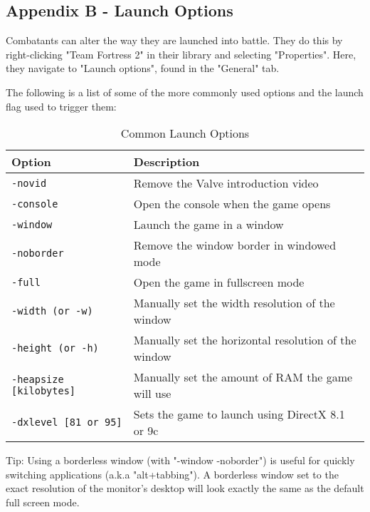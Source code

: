 \subsection{Appendix B - Launch Options}
Combatants can alter the way they are launched into battle. They do this by right-clicking "Team Fortress 2" in their library and selecting "Properties". Here, they navigate to "Launch options", found in the "General" tab.

The following is a list of some of the more commonly used options and the launch flag used to trigger them:

\begin{table}[h!b!p!]
\caption{Common Launch Options}
\begin{tabular}{|l|p{10.5cm}|}
	\hline
		Option & Description\\
	\hline
	\texttt{-novid}&Remove the Valve introduction video\\
	\texttt{-console}&Open the console when the game opens\\
	\texttt{-window}&Launch the game in a window\\
	\texttt{-noborder}&Remove the window border in windowed mode\\
	\texttt{-full}&Open the game in fullscreen mode\\
	\texttt{-width (or -w)}&Manually set the width resolution of the window\\
	\texttt{-height (or -h)}&Manually set the horizontal resolution of the window\\
	\texttt{-heapsize [kilobytes]}&Manually set the amount of RAM the game will use\\
	\texttt{-dxlevel [81 or 95]}&Sets the game to launch using DirectX 8.1 or 9c\\

  	\hline
\end{tabular}
\label{table_launch_options}
\end{table}

Tip: Using a borderless window (with "-window -noborder") is useful for quickly switching applications (a.k.a "alt+tabbing").  A borderless window set to the exact resolution of the monitor's desktop will look exactly the same as the default full screen mode.